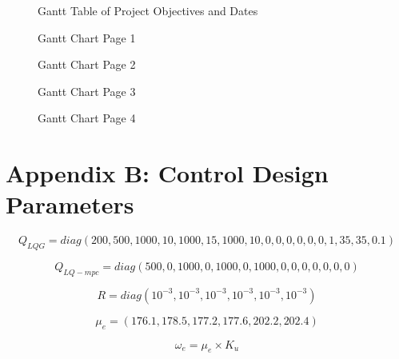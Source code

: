 \documentclass[12pt,a4paper,twoside]{report}
\begin{document}
		\newpage
		
			\begin{figure}[h!]
				\centering 
				
				\caption{Gantt Table of Project Objectives and Dates}
				\label{fig:Gantt Objectives and Dates}
			\end{figure}
			
			\newpage
			
			\begin{figure}[h!]
				\centering 
				
				\caption{Gantt Chart Page 1}
				\label{fig:Gantt Chart Page 1}
			\end{figure}
			
			\newpage
			
			\begin{figure}[h!]
				\centering 
				
				\caption{Gantt Chart Page 2}
				\label{fig:Gantt Chart Page 2}
			\end{figure}
			
			\newpage
			
			\begin{figure}[h!]
				\centering 
				
				\caption{Gantt Chart Page 3}
				\label{fig:Gantt Chart Page 3}
			\end{figure}
		
			\newpage
			
			\begin{figure}[h!]
				\centering 
				
				\caption{Gantt Chart Page 4}
				\label{fig:Gantt Chart Page 4}
			\end{figure}
		
	\chapter*{Appendix B: Control Design Parameters}
	
		\setcounter{MaxMatrixCols}{18}
		\begin{equation}
			Q_{LQG} = diag(200,500,1000,10,1000,15,1000,10,0,0,0,0,0,0,1,35,35,0.1)  
		\end{equation}
		
		\begin{equation}
			Q_{LQ-mpc} = diag(500,0,1000,0,1000,0,1000,0,0,0,0,0,0,0)
		\end{equation}
		
		\begin{equation}
			R = diag(10^{-3},10^{-3},10^{-3},10^{-3},10^{-3},10^{-3})
		\end{equation}
		
		\begin{equation}
			\mu_e = (176.1, 178.5, 177.2, 177.6, 202.2, 202.4)
		\end{equation}
		
		\begin{equation}
			\omega_e = \mu_e \times K_u 
		\end{equation}
		
\end{document}
